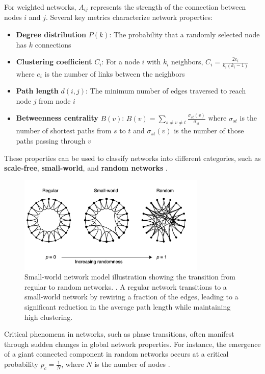 For weighted networks, $A_{ij}$ represents the strength of the connection between nodes $i$ and $j$. Several key metrics characterize network properties:

\begin{itemize}
    \item \textbf{Degree distribution} $P(k)$: The probability that a randomly selected node has $k$ connections
    \item \textbf{Clustering coefficient} $C_i$: For a node $i$ with $k_i$ neighbors, $C_i = \frac{2e_i}{k_i(k_i-1)}$ where $e_i$ is the number of links between the neighbors
    \item \textbf{Path length} $d(i,j)$: The minimum number of edges traversed to reach node $j$ from node $i$
    \item \textbf{Betweenness centrality} $B(v)$: $B(v) = \sum_{s \neq v \neq t} \frac{\sigma_{st}(v)}{\sigma_{st}}$ where $\sigma_{st}$ is the number of shortest paths from $s$ to $t$ and $\sigma_{st}(v)$ is the number of those paths passing through $v$
\end{itemize}

These properties can be used to classify networks into different categories, such as \textbf{scale-free}, \textbf{small-world}, and \textbf{random networks} \citep{barabasi1999emergence, watts1998collective}.

\begin{figure}[htbp]
    \centering
    \includegraphics[width=0.8\textwidth]{figures/networks.png}
    \caption{Small-world network model illustration showing the transition from regular to random networks. \citep{watts1998collective}. A regular network transitions to a small-world network by rewiring a fraction of the edges, leading to a significant reduction in the average path length while maintaining high clustering.}
    \label{fig:small_world}
\end{figure}

Critical phenomena in networks, such as phase transitions, often manifest through sudden changes in global network properties. For instance, the emergence of a giant connected component in random networks occurs at a critical probability $p_c = \frac{1}{N}$, where $N$ is the number of nodes \citep{erdos1960evolution}.

